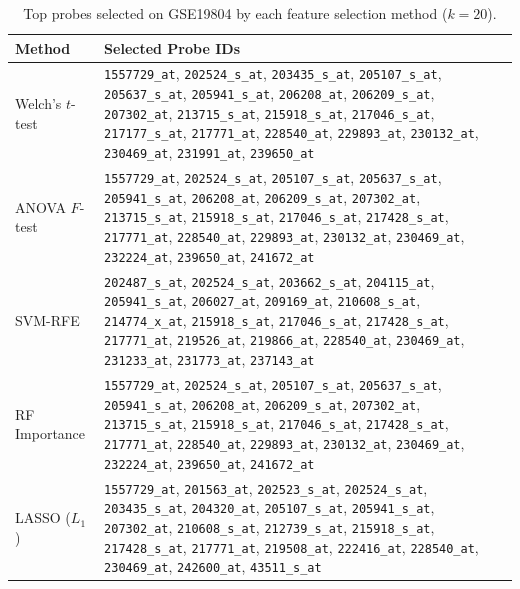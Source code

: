 \begin{table}[H]
\centering
\caption{Top probes selected on GSE19804 by each feature selection method ($k=20$).}
\label{tab:gse19804_probes}
\small
\begin{tabular}{lp{10cm}}
\toprule
\textbf{Method} & \textbf{Selected Probe IDs} \\
\midrule
Welch's $t$-test &
  \texttt{1557729\_at}, \texttt{202524\_s\_at}, \texttt{203435\_s\_at}, \texttt{205107\_s\_at},
  \texttt{205637\_s\_at}, \texttt{205941\_s\_at}, \texttt{206208\_at}, \texttt{206209\_s\_at},
  \texttt{207302\_at}, \texttt{213715\_s\_at}, \texttt{215918\_s\_at}, \texttt{217046\_s\_at},
  \texttt{217177\_s\_at}, \texttt{217771\_at}, \texttt{228540\_at}, \texttt{229893\_at},
  \texttt{230132\_at}, \texttt{230469\_at}, \texttt{231991\_at}, \texttt{239650\_at} \\
\midrule
ANOVA $F$-test &
  \texttt{1557729\_at}, \texttt{202524\_s\_at}, \texttt{205107\_s\_at}, \texttt{205637\_s\_at},
  \texttt{205941\_s\_at}, \texttt{206208\_at}, \texttt{206209\_s\_at}, \texttt{207302\_at},
  \texttt{213715\_s\_at}, \texttt{215918\_s\_at}, \texttt{217046\_s\_at}, \texttt{217428\_s\_at},
  \texttt{217771\_at}, \texttt{228540\_at}, \texttt{229893\_at}, \texttt{230132\_at},
  \texttt{230469\_at}, \texttt{232224\_at}, \texttt{239650\_at}, \texttt{241672\_at} \\
\midrule
SVM-RFE &
  \texttt{202487\_s\_at}, \texttt{202524\_s\_at}, \texttt{203662\_s\_at}, \texttt{204115\_at},
  \texttt{205941\_s\_at}, \texttt{206027\_at}, \texttt{209169\_at}, \texttt{210608\_s\_at},
  \texttt{214774\_x\_at}, \texttt{215918\_s\_at}, \texttt{217046\_s\_at}, \texttt{217428\_s\_at},
  \texttt{217771\_at}, \texttt{219526\_at}, \texttt{219866\_at}, \texttt{228540\_at},
  \texttt{230469\_at}, \texttt{231233\_at}, \texttt{231773\_at}, \texttt{237143\_at} \\
\midrule
RF Importance &
  \texttt{1557729\_at}, \texttt{202524\_s\_at}, \texttt{205107\_s\_at}, \texttt{205637\_s\_at},
  \texttt{205941\_s\_at}, \texttt{206208\_at}, \texttt{206209\_s\_at}, \texttt{207302\_at},
  \texttt{213715\_s\_at}, \texttt{215918\_s\_at}, \texttt{217046\_s\_at}, \texttt{217428\_s\_at},
  \texttt{217771\_at}, \texttt{228540\_at}, \texttt{229893\_at}, \texttt{230132\_at},
  \texttt{230469\_at}, \texttt{232224\_at}, \texttt{239650\_at}, \texttt{241672\_at} \\
\midrule
LASSO ($L_1$) &
  \texttt{1557729\_at}, \texttt{201563\_at}, \texttt{202523\_s\_at}, \texttt{202524\_s\_at},
  \texttt{203435\_s\_at}, \texttt{204320\_at}, \texttt{205107\_s\_at}, \texttt{205941\_s\_at},
  \texttt{207302\_at}, \texttt{210608\_s\_at}, \texttt{212739\_s\_at}, \texttt{215918\_s\_at},
  \texttt{217428\_s\_at}, \texttt{217771\_at}, \texttt{219508\_at}, \texttt{222416\_at},
  \texttt{228540\_at}, \texttt{230469\_at}, \texttt{242600\_at}, \texttt{43511\_s\_at} \\
\bottomrule
\end{tabular}
\end{table}


